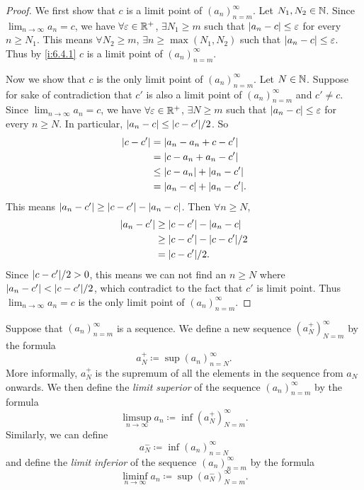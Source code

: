 \begin{proof}
  We first show that \(c\) is a limit point of \((a_n)_{n = m}^\infty\).
  Let \(N_1, N_2 \in \mathbb{N}\).
  Since \(\lim_{n \to \infty} a_n = c\), we have \(\forall \varepsilon \in \mathbb{R}^+\), \(\exists N_1 \geq m\) such that \(\left\lvert a_n - c\right\rvert \leq \varepsilon\) for every \(n \geq N_1\).
  This means \(\forall N_2 \geq m\), \(\exists n \geq \max(N_1, N_2)\) such that \(\left\lvert a_n - c\right\rvert \leq \varepsilon\).
  Thus by \cref{i:6.4.1} \(c\) is a limit point of \((a_n)_{n = m}^\infty\).

  Now we show that \(c\) is the only limit point of \((a_n)_{n = m}^\infty\).
  Let \(N \in \mathbb{N}\).
  Suppose for sake of contradiction that \(c'\) is also a limit point of \((a_n)_{n = m}^\infty\) and \(c' \neq c\).
  Since \(\lim_{n \to \infty} a_n = c\), we have \(\forall \varepsilon \in \mathbb{R}^+\), \(\exists N \geq m\) such that \(\left\lvert a_n - c\right\rvert \leq \varepsilon\) for every \(n \geq N\).
  In particular, \(\abs{a_n - c} \leq \abs{c - c'} / 2\).
  So
  \begin{align*}
    \abs{c - c'} & = \abs{a_n - a_n + c - c'}          \\
                 & = \abs{c - a_n + a_n - c'}          \\
                 & \leq \abs{c - a_n} + \abs{a_n - c'} \\
                 & = \abs{a_n - c} + \abs{a_n - c'}.
  \end{align*}
  This means \(\left\lvert a_n - c'\right\rvert \geq \left\lvert c - c'\right\rvert - \left\lvert a_n - c\right\rvert\).
  Then \(\forall n \geq N\),
  \begin{align*}
    \abs{a_n - c'} & \geq \abs{c - c'} - \abs{a_n - c}    \\
                   & \geq \abs{c - c'} - \abs{c - c'} / 2 \\
                   & = \abs{c - c'} / 2.
  \end{align*}
  Since \(\abs{c - c'} / 2 > 0\), this means we can not find an \(n \geq N\) where \(\abs{a_n - c'} < \abs{c - c'} / 2\), which contradict to the fact that \(c'\) is limit point.
  Thus \(\lim_{n \to \infty} a_n = c\) is the only limit point of \((a_n)_{n = m}^\infty\).
\end{proof}

\begin{defn}\label{i:6.4.6}
  Suppose that \((a_n)_{n = m}^\infty\) is a sequence.
  We define a new sequence \((a_N^+)_{N = m}^\infty\) by the formula
  \[
    a_N^+ \coloneqq \sup(a_n)_{n = N}^\infty.
  \]
  More informally, \(a_N^+\) is the supremum of all the elements in the sequence from \(a_N\) onwards.
  We then define the \emph{limit superior} of the sequence \((a_n)_{n = m}^\infty\) by the formula
  \[
    \limsup_{n \to \infty} a_n \coloneqq \inf(a_N^+)_{N = m}^\infty.
  \]
  Similarly, we can define
  \[
    a_N^- \coloneqq \inf(a_n)_{n = N}^\infty
  \]
  and define the \emph{limit inferior} of the sequence \((a_n)_{n = m}^\infty\) by the formula
  \[
    \liminf_{n \to \infty} a_n \coloneqq \sup(a_N^-)_{N = m}^\infty.
  \]
\end{defn}

